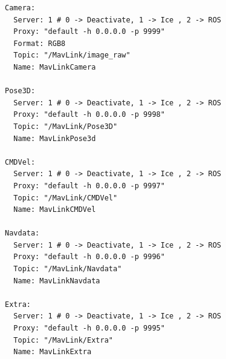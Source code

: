 \begin{lstlisting}[frame=single]
Camera:
  Server: 1 # 0 -> Deactivate, 1 -> Ice , 2 -> ROS
  Proxy: "default -h 0.0.0.0 -p 9999"
  Format: RGB8
  Topic: "/MavLink/image_raw"
  Name: MavLinkCamera

Pose3D:
  Server: 1 # 0 -> Deactivate, 1 -> Ice , 2 -> ROS
  Proxy: "default -h 0.0.0.0 -p 9998"
  Topic: "/MavLink/Pose3D"
  Name: MavLinkPose3d

CMDVel:
  Server: 1 # 0 -> Deactivate, 1 -> Ice , 2 -> ROS
  Proxy: "default -h 0.0.0.0 -p 9997"
  Topic: "/MavLink/CMDVel"
  Name: MavLinkCMDVel

Navdata:
  Server: 1 # 0 -> Deactivate, 1 -> Ice , 2 -> ROS
  Proxy: "default -h 0.0.0.0 -p 9996"
  Topic: "/MavLink/Navdata"
  Name: MavLinkNavdata

Extra:
  Server: 1 # 0 -> Deactivate, 1 -> Ice , 2 -> ROS
  Proxy: "default -h 0.0.0.0 -p 9995"
  Topic: "/MavLink/Extra"
  Name: MavLinkExtra
\end{lstlisting}
